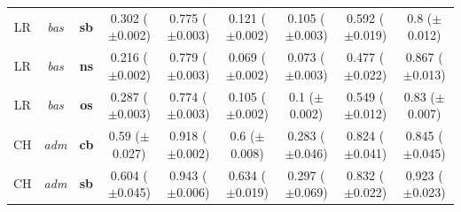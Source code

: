\documentclass[a4paper,11pt]{article}
\begin{document}
\begin{longtable}[t]{ccccccccc}
LR & \emph{bas} & \textbf{sb} & \shortstack{0.302 \\ ($\pm$0.002)} & \shortstack{0.775 \\ ($\pm$0.003)} & \shortstack{0.121 \\ ($\pm$0.002)} & \shortstack{0.105 \\ ($\pm$0.003)} & \shortstack{0.592 \\ ($\pm$0.019)} & \shortstack{0.8 \\ ($\pm$0.012)}\\
LR & \emph{bas} & \textbf{ns} & \shortstack{0.216 \\ ($\pm$0.002)} & \shortstack{0.779 \\ ($\pm$0.003)} & \shortstack{0.069 \\ ($\pm$0.002)} & \shortstack{0.073 \\ ($\pm$0.003)} & \shortstack{0.477 \\ ($\pm$0.022)} & \shortstack{0.867 \\ ($\pm$0.013)}\\
LR & \emph{bas} & \textbf{os} & \shortstack{0.287 \\ ($\pm$0.003)} & \shortstack{0.774 \\ ($\pm$0.003)} & \shortstack{0.105 \\ ($\pm$0.002)} & \shortstack{0.1 \\ ($\pm$0.002)} & \shortstack{0.549 \\ ($\pm$0.012)} & \shortstack{0.83 \\ ($\pm$0.007)}\\
\addlinespace
CH & \emph{adm} & \textbf{cb} & \shortstack{0.59 \\ ($\pm$0.027)} & \shortstack{0.918 \\ ($\pm$0.002)} & \shortstack{0.6 \\ ($\pm$0.008)} & \shortstack{0.283 \\ ($\pm$0.046)} & \shortstack{0.824 \\ ($\pm$0.041)} & \shortstack{0.845 \\ ($\pm$0.045)}\\
CH & \emph{adm} & \textbf{sb} & \shortstack{0.604 \\ ($\pm$0.045)} & \shortstack{0.943 \\ ($\pm$0.006)} & \shortstack{0.634 \\ ($\pm$0.019)} & \shortstack{0.297 \\ ($\pm$0.069)} & \shortstack{0.832 \\ ($\pm$0.022)} & \shortstack{0.923 \\ ($\pm$0.023)}\\

\end{longtable}
\end{document}
